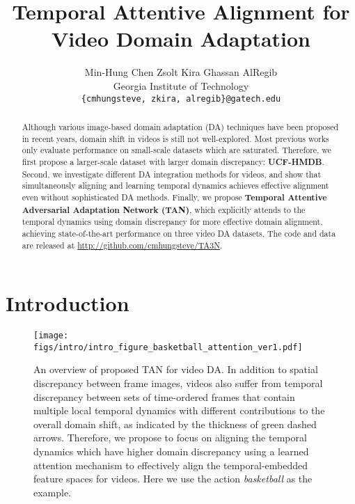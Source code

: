 \documentclass[10pt,twocolumn,letterpaper]{article}
\begin{document}
\title{Temporal Attentive Alignment for Video Domain Adaptation}

\author{Min-Hung Chen \hspace{3em}
Zsolt Kira \hspace{3em}
Ghassan AlRegib \\
Georgia Institute of Technology\\
{\tt\small \{cmhungsteve, zkira, alregib\}@gatech.edu}
}

\maketitle


\begin{abstract}
   Although various image-based domain adaptation (DA) techniques have been proposed in recent years, domain shift in videos is still not well-explored. Most previous works only evaluate performance on small-scale datasets which are saturated. Therefore, we first propose a larger-scale dataset with larger domain discrepancy: \textbf{UCF-HMDB}. Second, we investigate different DA integration methods for videos, and show that simultaneously aligning and learning temporal dynamics achieves effective alignment even without sophisticated DA methods. Finally, we propose \textbf{Temporal Attentive Adversarial Adaptation Network (TAN)}, which explicitly attends to the temporal dynamics using domain discrepancy for more effective domain alignment, achieving state-of-the-art performance on three video DA datasets. The code and data are released at \url{http://github.com/cmhungsteve/TA3N}.
\end{abstract}

\section{Introduction}

\begin{figure}[!t]
\centering
\texttt{[image: figs/intro/intro\_figure\_basketball\_attention\_ver1.pdf]}
\caption{An overview of proposed TAN for video DA. 
In addition to spatial discrepancy between frame images, videos also suffer from temporal discrepancy between sets of time-ordered frames that contain multiple local temporal dynamics with different contributions to the overall domain shift, as indicated by the thickness of green dashed arrows. 
Therefore, we propose to focus on aligning the temporal dynamics which have higher domain discrepancy using a learned attention mechanism to effectively align the temporal-embedded feature spaces for videos.
Here we use the action \textit{basketball} as the example.}
\label{fig:overview_video_DA}
\end{figure}
\end{document}
